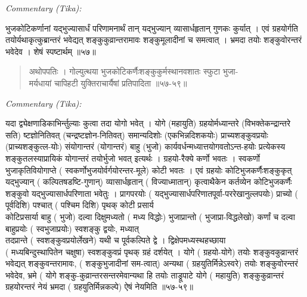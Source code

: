 \documentclass[11pt,a4paper]{article}
\newcommand{\skt}[1]{{\devanagarifont\color{sktcolor} #1}}
\newenvironment{shloka}{%
  \begin{quote}%
  \smallskip%
  \devanagarifont\color{sktcolor}%
}{%
  \smallskip%
  \end{quote}%
}
\newenvironment{tika}{%
  \smallskip%
  \noindent\textit{Commentary (Tika):}\par%
  \smallskip%
  \hindifont\small%
}{%
  \par\smallskip%
}
\begin{document}
\vspace{0.3cm}
\begin{tika}
\skt{भुजकोटिकर्णानां यद्भुज्यासार्धं परिणामनार्थं तान् यद्भुज्यान् व्यासार्धहृतान् गुणकः कुर्यात्} । एवं ग्रहयोर्गति तयोर्यथाकृत्कुब्रान्तरं भवेद्यत् शङ्कुकुव्रान्तरामावः शङ्कुमूलादीनां च समत्वात् । भ्रमदा तयोः शङ्कुवोरन्तरं भवेदेव । शेषं स्पष्टार्थम् ॥५७॥
\end{tika}

\vspace{0.5cm}

\begin{shloka}
\skt{अथोपपतिः । गोल्युत्थया भुजकोटिकर्णैःशङ्कुकुर्मस्थानवशातः स्फुटा भुजा-}\\
\skt{मर्यधायां चापिहटी युक्तिराचार्यैषां प्रतिपादिता} ॥५७-५९॥
\end{shloka}

\vspace{0.3cm}
\begin{tika}
\skt{यदा द्व्येक्षणाडिकाभिर्न्तुल्याः कुत्वा तदा योगो भवेत् । योगे} (महायुति) \skt{ग्रहयोर्मध्यान्तरे} (विभक्तेकन्द्रान्तरे सति) \skt{ष्टज्ञोनितिवत्} (चन्द्रष्टज्ञोन-नितिवत्) \skt{समान्यदिशोः} (एकभिन्नदिशकयोः) \skt{प्राच्यशङ्कुवप्रयोः} (प्राच्यशङ्कुत्ल-योः) \skt{संयोगान्तरं} (योगान्तरं) \skt{बाहु} (भुजो) \skt{कार्यवर्धन्मध्यात्तयोगवतोऽन्त-हयोः प्रत्येकस्य शङ्कुतलस्याप्रायिकं योगान्तरं तयोर्भुजो भवत् इत्यर्थः । ग्रहयो-रैक्ये कर्णो भवतः । स्वकर्णो भुजाकृतिवियोगाप्ते} (\skt{स्वकर्णोभुजयोर्वर्गयोरन्तर-मूले}) \skt{कोटी भवतः । एवं ग्रहयोः कोटिभुजकर्णैःशङ्कुकृत् यद्भुज्यान्} (\skt{कल्पितषडष्टि-गुणान्}) \skt{व्यासार्धहृतान्} (\skt{विज्याध्मातान्}) \skt{कृत्वाथैकेन कर्तव्येन कोटिभुजकर्णैः}\\
\skt{शङ्कुवो यद्भुज्यासार्धपरिणाता भवेतुः । प्रागपरयोः} (\skt{यद्भुज्यासार्धपरिणातपूर्वा-पररेखानुल्लपयोः}) \skt{प्राच्यो} (\skt{पूर्वदिशि}) \skt{पश्चात्} (\skt{पश्चिम दिशि}) \skt{पृथक् कोटी प्रसार्य}\\
\skt{कोटिप्रसार्या बाहु} (\skt{भुजो}) \skt{दल्वा दिक्षुमध्यतो} (\skt{मध्य विद्धोः}) \skt{भुजाप्रान्तो} (\skt{भुजाप्रा-विद्धलेखो}) \skt{कर्णां च दल्वा बाहुप्रयोः} (\skt{स्वभुजाप्रयोः}) \skt{स्वशङ्कु} द्वयोः, \skt{मध्यात्}\\
\skt{तदप्रान्ते} (\skt{स्वशङ्कुवप्रयोर्लेखने}) \skt{यथी च पूर्वकल्पिते द्वे} । \skt{द्विक्षेपमध्यस्थहच्छाया}\\
(\skt{मध्यबिन्दुस्थापितेन चक्षुषा}) \skt{स्वशङ्कुवप्रं पृथक् ग्रहं दर्शयेत् । योगे} (\skt{ग्रहयो-योगे}) \skt{तयोः शङ्कुवकुव्रान्तरं भवेद्यत् शङ्कुवन्तरामावः,} (\skt{शङ्कुभुजादीनां सम-त्वात्}) \skt{अन्यथा} (\skt{ग्रहयुतिर्मिन्नेऽस्वरे}) \skt{तयोः शङ्कुवोरन्तरं भवेदेव, भ्रमे} (\skt{योगे शङ्कु-कुव्रान्तरसन्तरमेवान्यथा हि तयोः} ताड्रूपाटे \skt{योगे} (\skt{महायुति}) \skt{शङ्कुकुव्रान्तरं}\\
\skt{ग्रहयोरन्तरं नेयं भ्रमदा} (\skt{ग्रहयुतिर्मिन्नकल्पे}) \skt{ऐषं नेयमिति} ॥५७-५९॥
\end{tika}
\end{document}
